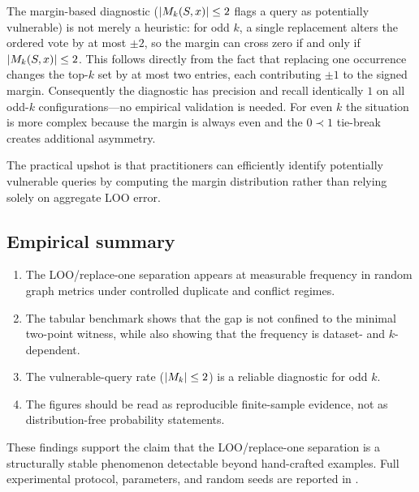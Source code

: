 The margin-based diagnostic ($|M_k(S,x)| \le 2$ flags a query as potentially
vulnerable) is not merely a heuristic: for odd $k$, a single replacement
alters the ordered vote by at most $\pm 2$, so the margin can cross zero if and
only if $|M_k(S,x)| \le 2$.  This follows directly from the fact that
replacing one occurrence changes the top-$k$ set by at most two entries, each
contributing $\pm 1$ to the signed margin.  Consequently the diagnostic has
precision and recall identically $1$ on all odd-$k$ configurations---no
empirical validation is needed.  For even $k$ the situation is more complex
because the margin is always even and the $0 \prec 1$ tie-break creates
additional asymmetry.

The practical upshot is that practitioners can efficiently identify potentially
vulnerable queries by computing the margin distribution rather than relying
solely on aggregate LOO error.

\subsection{Empirical summary}

\begin{enumerate}[leftmargin=*,label=(\arabic*)]
    \item The LOO/replace-one separation appears at measurable frequency in
        random graph metrics under controlled duplicate and conflict regimes.
    \item The tabular benchmark shows that the gap is not confined to the
        minimal two-point witness, while also showing that the frequency is
        dataset- and $k$-dependent.
    \item The vulnerable-query rate ($|M_k| \le 2$) is a reliable diagnostic
        for odd $k$.
    \item The figures should be read as reproducible finite-sample evidence,
        not as distribution-free probability statements.
\end{enumerate}

These findings support the claim that the LOO/replace-one separation is a
structurally stable phenomenon detectable beyond hand-crafted examples.  Full
experimental protocol, parameters, and random seeds are reported in
.
